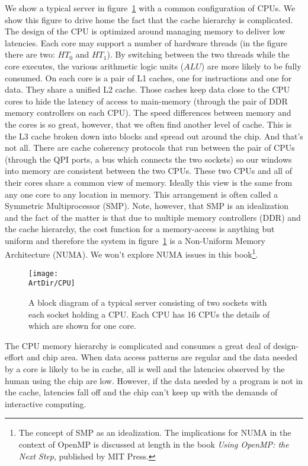 We show a typical server in figure~\ref{figure:CPU} with a common configuration of CPUs.   
We show this figure to drive home the fact that the cache hierarchy is complicated.  The design
of the CPU is optimized around managing memory to deliver low latencies.   Each core may
support a number of hardware threads (in the figure there are two: $HT_0$ and $HT_1$).  By switching between the two threads
while the core executes, the various arithmetic logic units ($ALU$) are more likely to be fully consumed.
On each core is a pair of L1 caches, one for instructions and one for
data.  They share a unified L2 cache.   Those caches keep data close to the CPU cores to hide the latency
of access to main-memory (through the pair of DDR memory controllers on each CPU).  The speed differences
between memory and the cores is so great, however, that we often find another level of cache.  This is the L3 
cache broken down into blocks and spread out around the chip.   And that's not all.  There are cache coherency
protocols that run between the pair of CPUs (through the QPI ports, a bus which connects the two sockets) 
so our windows into memory are
consistent between the two CPUs.  These two CPUs and all of their cores share a common view of memory. 
Ideally this view is the same from any one core to any location in memory. This arrangement is often 
called a Symmetric Multiprocessor (SMP).   Note, however, that SMP is an idealization and the fact of the matter
is that due to multiple memory controllers (DDR) and the cache hierarchy, the cost function for a memory-access is
anything but uniform and therefore the system in figure~\ref{figure:CPU} is a Non-Uniform Memory Architecture (NUMA).
We won't explore NUMA issues in this book\footnote{The concept of SMP as an idealization. The implications
for NUMA in the context of OpenMP is discussed at length in the book \emph{Using OpenMP: the Next Step}, published by MIT Press.}.

\begin{figure}[t]
\centerline{\texttt{[image: \\ArtDir/CPU]}}
\caption{A block diagram of a typical server consisting of two sockets with each socket holding a CPU. Each
CPU has 16 CPUs the details of which are shown for one core.}
\label{figure:CPU}
\end{figure}

The CPU memory hierarchy is complicated and consumes a great deal of design-effort and chip area.  
When data access patterns are regular and the data needed by a core is likely to be in cache, all is well and 
the latencies observed by the human using the chip are low.  However, if the data needed by a program is
not in the cache, latencies fall off and the chip can't keep up with the demands of interactive computing.

